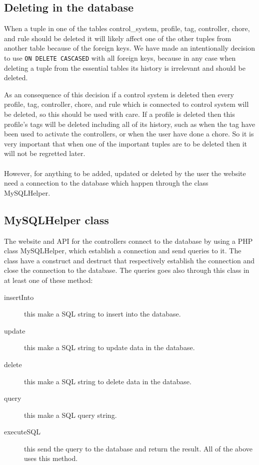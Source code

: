 \subsection{Deleting in the database}
When a tuple in one of the tables control\_system, profile, tag, controller, chore, and rule should be deleted it will likely affect one of the other tuples from another table because of the foreign keys. We have made an intentionally decision to use \texttt{ON DELETE CASCASED} with all foreign keys, because in any case when deleting a tuple from the essential tables its history is irrelevant and should be deleted.


As an consequence of this decision if a control system is deleted then every profile, tag, controller, chore, and rule which is connected to control system will be deleted, so this should be used with care. 
If a profile is deleted then this profile's tags will be deleted including all of its history, such as when the tag have been used to activate the controllers, or when the user have done a chore.
 So it is very important that when one of the important tuples are to be deleted then it will not be regretted later.  \\\\

However, for anything to be added, updated or deleted by the user the website need a connection to the database which happen through the class MySQLHelper. 

\subsection{MySQLHelper class}
The website and API for the controllers connect to the database by using a PHP class MySQLHelper, which establish a connection and send queries to it. The class have a construct and destruct that respectively establish the connection and close the connection to the database. The queries goes also through this class in at least one of these method:

\begin{description}
	\item[insertInto] this make a SQL string to insert into the database.
	\item[update] this make a SQL string to update data in the database.	
	\item[delete] this make a SQL string to delete data in the database.
	\item[query] this make a SQL query string.
	\item[executeSQL] this send the query to the database and return the result. All of the above uses this method.
\end{description}
  
